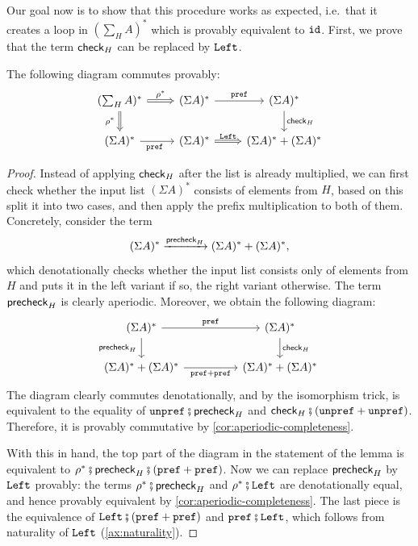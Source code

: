 Our goal now is to show that this procedure works as expected, i.e.~that it creates a loop in $(\sum_H A)^*$ which is provably equivalent to $\mathtt{id}$. First, we prove that the term $\mathsf{check}_H$ can be replaced by $\mathtt{Left}$.

\begin{lemma}\label{lem:checkterm-leftterm}
    The following diagram commutes provably:
    \[
    \begin{tikzcd}
        (\sum_H A)^*
        \ar[r, \dropar, "\rho^*"]
        \ar[d, \dropar, "\rho^*"'{xshift=-0.5ex}]
        &(\Sigma A)^*
        \ar[r, "\prefterm"]
        &(\Sigma A)^*
        \ar[d, "\checkterm_H"]
        \\ 
        (\Sigma A)^*
        \ar[r, "\prefterm"'{xshift=-0.5ex}]
        &(\Sigma A)^*
        \ar[r, \dropar, "\leftterm"]
        &(\Sigma A)^* + (\Sigma A)^*
    \end{tikzcd}
    \]
\end{lemma}
\begin{proof}
    Instead of applying $\mathsf{check}_H$ after the list is already multiplied, we can first check whether the input list $(\Sigma A)^*$ consists of elements from $H$, based on this split it into two cases, and then apply the prefix multiplication to both of them. Concretely, consider the term \[
        (\Sigma A)^* \xrightarrow{\mathsf{precheck}_H} (\Sigma A)^* + (\Sigma A)^*,
    \]
    which denotationally checks whether the input list consists only of elements from $H$ and puts it in the left variant if so, the right variant otherwise. The term $\mathsf{precheck}_H$ is clearly aperiodic. Moreover, we obtain the following diagram:
    \[
    \begin{tikzcd}[column sep=huge]
        (\Sigma A)^* 
        \ar[r, "\prefterm"]
        \ar[d, "\precheckterm_H"'{xshift=-0.5ex}]
        &(\Sigma A)^*
        \ar[d, "\checkterm_H"]
        \\ 
        (\Sigma A)^* + (\Sigma A)^*
        \ar[r, "\prefterm + \prefterm"']
        &(\Sigma A)^* + (\Sigma A)^*
    \end{tikzcd}
    \]
    The diagram clearly commutes denotationally, and by the isomorphism trick, is equivalent to the equality of  $\unprefterm \comp \precheckterm_H$ and $\checkterm_H \comp (\unprefterm + \unprefterm)$. Therefore, it is provably commutative by \cref{cor:aperiodic-completeness}.

    With this in hand, the top part of the diagram in the statement of the lemma is equivalent to 
    $\rho^* \comp \precheckterm_H \comp (\prefterm + \prefterm)$. Now we can replace $\mathsf{precheck}_H$ by $\mathtt{Left}$ provably: the terms $\rho^* \comp \precheckterm_H$ and $\rho^* \comp \leftterm$ are denotationally equal, and hence provably equivalent by \cref{cor:aperiodic-completeness}. The last piece is the equivalence of $\leftterm \comp (\prefterm + \prefterm)$ and $\prefterm \comp \leftterm$, which follows from naturality of $\mathtt{Left}$ (\cref{ax:naturality}).
\end{proof}

